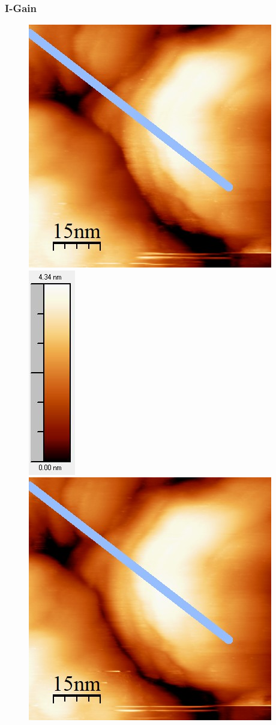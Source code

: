 \documentclass[12pt,a4paper]{article}
\begin{document}
\subsubsection{I-Gain}
\begin{figure}
\centering
\includegraphics[scale=0.6]{Bilder/Anhang/IGain/1000_IGain_vor.jpg}
\includegraphics[scale=0.6]{Bilder/Anhang/IGain/1000_IGain_vor_Skala.jpg}
\includegraphics[scale=0.6]{Bilder/Anhang/IGain/1000_IGain_nach.jpg}

\end{figure}
\end{document}
